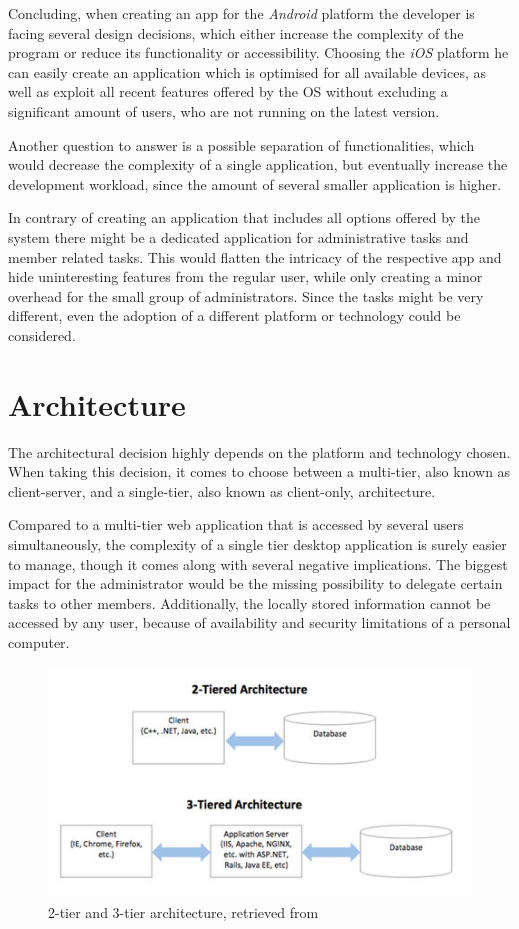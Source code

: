 Concluding, when creating an app for the \emph{Android} platform the developer is facing several design decisions, which either increase the complexity of the program or reduce its functionality or accessibility. Choosing the \emph{iOS} platform he can easily create an application which is optimised for all available devices, as well as exploit all recent features offered by the \gls{OS} without excluding a significant amount of users, who are not running on the latest version. 

Another question to answer is a possible separation of functionalities, which would decrease the complexity of a single application, but eventually increase the development workload, since the amount of several smaller application is higher. 

In contrary of creating an application that includes all options offered by the system there might be a dedicated application for administrative tasks and member related tasks. This would flatten the intricacy of the respective app and hide uninteresting features from the regular user, while only creating a minor overhead for the small group of administrators. Since the tasks might be very different, even the adoption of a different platform or technology could be considered. 

\section{Architecture} %
\label{sec:Architecture}
The architectural decision highly depends on the platform and technology chosen. When taking this decision, it comes to choose between a multi-tier, also known as client-server, and a single-tier, also known as client-only, architecture.

Compared to a multi-tier web application that is accessed by several users simultaneously, the complexity of a single tier desktop application is surely easier to manage, though it comes along with several negative implications. The biggest impact for the administrator would be the missing possibility to delegate certain tasks to other members. Additionally, the locally stored information cannot be accessed by any user, because of availability and security limitations of a personal computer.

\begin{figure}[h]
  	\centering
  	\includegraphics[width=0.7\linewidth]{./images/tier-architecture.jpg}
  	\caption{2-tier and 3-tier architecture, retrieved from \cite{Wright:2015aa}}
	\label{fig:TierArchitecture}
\end{figure}
\nocite{Wright:2015aa}

